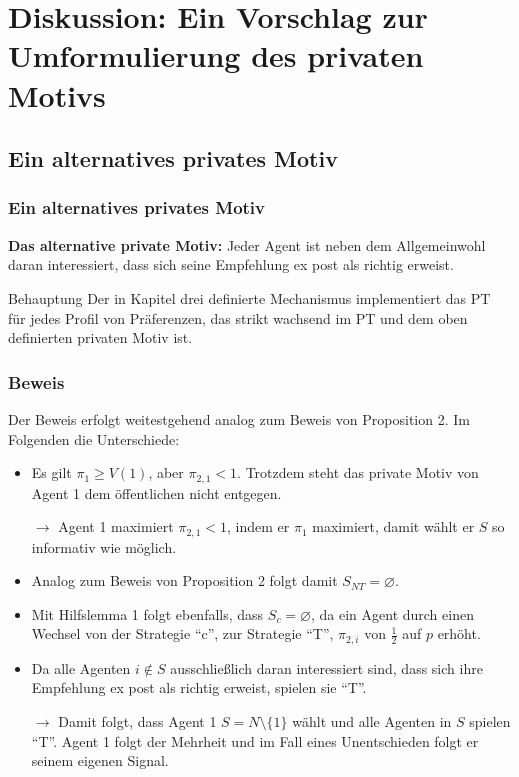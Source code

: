 \documentclass{beamer}
\begin{document}
\section[alternatives privates Motiv]{Diskussion: Ein Vorschlag zur Umformulierung des privaten Motivs}

\subsection{Ein alternatives privates Motiv}
\begin{frame}\frametitle{Ein alternatives privates Motiv}
\vspace{-1.2cm}
\textbf{Das alternative private Motiv:} Jeder Agent ist neben dem Allgemeinwohl daran interessiert, dass sich seine Empfehlung ex post als richtig erweist.
\vspace{0.4cm}
\begin{block}{Behauptung}
Der in Kapitel drei definierte Mechanismus implementiert das PT f\"ur jedes Profil von Pr\"aferenzen, das strikt wachsend im PT und dem oben definierten privaten Motiv ist.
\end{block}


\end{frame}





\begin{frame}\frametitle{Beweis}
\vspace{0.4cm}
Der Beweis erfolgt weitestgehend analog zum Beweis von Proposition 2. Im Folgenden die Unterschiede:
\begin{itemize}
\item Es gilt $\pi_1 \geq V(1)$, aber $\pi_{2,1}<1$. Trotzdem steht das private Motiv von Agent 1 dem \"offentlichen nicht entgegen.
\item [$\rightarrow$] Agent 1 maximiert $\pi_{2,1}<1$, indem er $\pi_1$ maximiert, damit w\"ahlt er $S$ so informativ wie m\"oglich.
\item Analog zum Beweis von Proposition 2 folgt damit $S_{NT}=\varnothing$.
\item Mit Hilfslemma 1 folgt ebenfalls, dass $S_c=\varnothing$, da ein Agent durch einen Wechsel von der Strategie ``c'', zur Strategie ``T'', $\pi_{2,i}$ von $\frac{1}{2}$ auf $p$ erh\"oht.
\item Da alle Agenten $i\notin S$ ausschlie{\ss}lich daran interessiert sind, dass sich ihre Empfehlung ex post als richtig erweist, spielen sie ``T''.
\item [$\rightarrow$] Damit folgt, dass Agent 1 $S=N\setminus \{1\}$ w\"ahlt und alle Agenten in $S$ spielen ``T''. Agent 1 folgt der Mehrheit und im Fall eines Unentschieden folgt er seinem eigenen Signal.
\end{itemize}
\end{frame}
\end{document}
